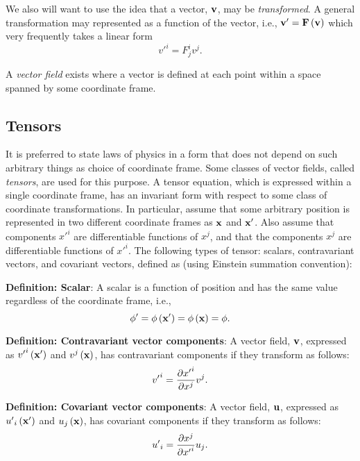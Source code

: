 \documentclass{llncs}
\begin{document}
We also will want to use the idea that a vector, ${\bf v}$, may
be {\em transformed}.
A general transformation may represented as a function of the vector,
i.e.,
${\bf v}' = {\bf F} \left({\bf v} \right)$
which very frequently takes a linear form
\begin{equation}
{v'}^i = F^i_j v^j   .
\end{equation}

A {\em vector field} exists where a vector is defined at each point
within a space spanned by some coordinate frame.


\subsection{Tensors}

It is preferred to state laws of physics in a form that does not
depend on such arbitrary things as choice of coordinate frame.
Some classes of vector fields, called {\em tensors}, are used for this
purpose.
A tensor equation, which is expressed within a single coordinate frame,
has an invariant form with respect to some class of coordinate
transformations.
In particular, assume that some arbitrary position is represented in
two different coordinate frames as ${\bf x}$ and ${\bf x}'$.
Also assume that components ${x'}^i$ are differentiable functions of
$x^j$, and that the components $x^j$ are differentiable functions
of ${x'}^i$.
The following types of tensor: scalars, contravariant vectors, and
covariant vectors, defined as (using Einstein summation convention):

{\bf Definition: Scalar}: 
A scalar is a function of position and has the same value regardless
of the coordinate frame, i.e., 
\begin{equation}
{\phi '} = \phi \left({\bf x}'\right) = {\phi}
\left({\bf x}\right) = \phi.
\end{equation}

{\bf Definition: Contravariant vector components}:
A vector field, ${\bf v}$, expressed as ${v'}^i \left( {\bf x}'\right)$ and $v^j \left({\bf x}\right)$, 
has contravariant components if they transform as follows:
\begin{equation}
{v'}^i = {\partial {x'}^i \over \partial x^j} v^j .
\end{equation}

{\bf Definition: Covariant vector components}:
A vector field, ${\bf u}$, expressed as ${u'}_i \left( {\bf x}'\right)$ and $u_j \left({\bf x}\right)$,
has covariant components if they transform as follows:
\begin{equation}
{u'}_i = {\partial x^{j} \over \partial {x'}^i} u_j  .
\end{equation}
\end{document}
